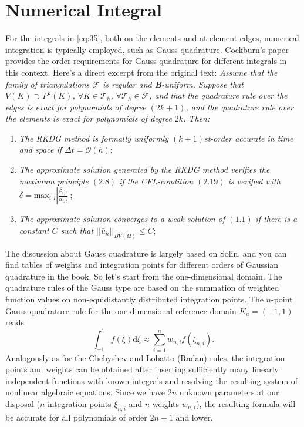 \documentclass{develop-note}
\begin{document}
\section{Numerical Integral}

For the integrals in \autoref{eq:35}, both on the elements and at element edges, numerical integration is typically employed, such as Gauss quadrature. Cockburn's paper\cite{cockburnRungeKuttaLocalProjection1990} provides the order requirements for Gauss quadrature for different integrals in this context. Here's a direct excerpt from the original text: \textit{Assume that the family of triangulations $\mathscr{F}$ is regular and \textbf{B}-uniform. Suppose that $V(K)\supset P^{k}(K)$, $\forall K\in\mathscr{T}_{h}$, $\forall\mathscr{T}_{h}\in\mathscr{F}$, and that the quadrature rule over the edges is exact for polynomials of degree $(2k +1)$, and the quadrature rule over the elements is exact for polynomials of degree $2k$. Then:}
\begin{enumerate}
  \item \textit{The RKDG method is formally uniformly $(k+1)$st-order accurate in time and space if $\Delta t=\mathcal{O}(h)$};
  \item \textit{The approximate solution generated by the RKDG method verifies the maximum principle $(2.8)$ if the CFL-condition $(2.19)$ is verified with $\delta=\mathrm{max}_{i,l}\left|\frac{\beta_{i,l}}{\alpha_{i,l}}\right|$};
  \item \textit{The approximate solution converges to a weak solution of $(1.1)$ if there is a constant $C$ such that $||\bar{u}_{h}||_{BV(\Omega)}\le C$};
\end{enumerate}

The discussion about Gauss quadrature is largely based on Solin\cite{solinHigherOrderFiniteElement2003}, and you can find tables of weights and integration points for different orders of Gaussian quadrature in the book. So let's start from the one-dimensional domain. The quadrature rules of the Gauss type are based on the summation of weighted function values on non-equidistantly distributed integration points. The $n$-point Gauss quadrature rule for the one-dimensional reference domain $K_{a}=(-1,1)$ reads
\begin{equation}
  \int_{-1}^{1}f(\xi)\mathrm{d}\xi\approx\sum_{i=1}^{n}w_{n,i}f(\xi_{n,i}).
\end{equation}
Analogously as for the Chebyshev and Lobatto (Radau) rules, the integration points and weights can be obtained after inserting sufficiently many linearly independent functions with known integrals and resolving the resulting system of nonlinear algebraic equations. Since we have $2n$ unknown parameters at our disposal ($n$ integration points $\xi_{n,i}$ and $n$ weights $w_{n,i}$), the resulting formula will be accurate for all polynomials of order $2n-1$ and lower.
\end{document}
